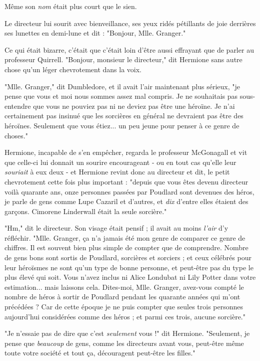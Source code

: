 Même son \emph{nom}  était plus court que le sien.

Le directeur lui sourit avec bienveillance, ses yeux ridés pétillants de joie derrières ses lunettes en demi-lune et dit : "Bonjour, Mlle. Granger."

Ce qui était bizarre, c'était que c'était loin d'être aussi effrayant que de parler au professeur Quirrell. "Bonjour, monsieur le directeur," dit Hermione sans autre chose qu'un léger chevrotement dans la voix.

"Mlle. Granger," dit Dumbledore, et il avait l'air maintenant plus sérieux, "je pense que vous et moi nous sommes assez mal compris. Je ne souhaitais pas sous-entendre que vous ne pouviez pas ni ne deviez pas être une héroïne. Je n'ai certainement pas insinué que les sorcières en général ne devraient pas être des héroïnes. Seulement que vous étiez... un peu jeune pour penser à ce genre de choses."

Hermione, incapable de s'en empêcher, regarda le professeur McGonagall et vit que celle-ci lui donnait un sourire encourageant - ou en tout cas qu'elle leur \emph{souriait } à eux deux - et Hermione revint donc au directeur et dit, le petit chevrotement cette fois plus important : "depuis que vous êtes devenu directeur voilà quarante ans, onze personnes passées par Poudlard sont devenues des héros, je parle de gens comme Lupe Cazaril et d'autres, et \emph{dix}  d'entre elles étaient des garçons. Cimorene Linderwall était la seule sorcière."

"Hm," dit le directeur. Son visage était pensif ; il avait au moins \emph{l'air}  d'y réfléchir. "Mlle. Granger, ça n'a jamais été mon genre de comparer ce genre de chiffres. Il est souvent bien plus simple de compter que de comprendre. Nombre de gens bons sont sortis de Poudlard, sorcières et sorciers ; et ceux célébrés pour leur héroïsmes ne sont qu'un type de bonne personne, et peut-être pas du type le plus élevé qui soit. Vous n'avez inclus ni Alice Londubat ni Lily Potter dans votre estimation... mais laissons cela. Dites-moi, Mlle. Granger, avez-vous compté le nombre de héros à sortir de Poudlard pendant les quarante années qui m'ont précédées ? Car de cette époque je ne puis compter que seules trois personnes aujourd'hui considérées comme des héros ; et parmi ces trois, aucune sorcière."

"Je n'essaie pas de dire que c'est \emph{seulement}  vous !" dit Hermione. "Seulement, je pense que \emph{beaucoup}  de gens, comme les directeurs avant vous, peut-être même toute votre société et tout ça, découragent peut-être les filles."

